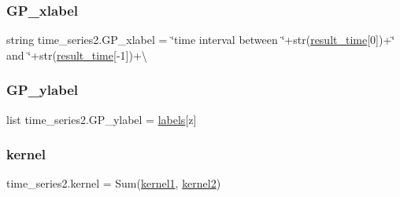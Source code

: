 \mbox{\label{namespacetime__series2_ab96e591ad1ad71d491e9c0911dbcfb3f}} 
\subsubsection{\texorpdfstring{G\+P\+\_\+xlabel}{GP\_xlabel}}
{\footnotesize\ttfamily string time\+\_\+series2.\+G\+P\+\_\+xlabel = \char`\"{}time interval between \char`\"{}+str(\mbox{\hyperlink{namespacetime__series2_a8bc1ba75be8714303adfe853be1fdfa7}{result\+\_\+time}}\mbox{[}0\mbox{]})+\char`\"{} and \char`\"{}+str(\mbox{\hyperlink{namespacetime__series2_a8bc1ba75be8714303adfe853be1fdfa7}{result\+\_\+time}}\mbox{[}-\/1\mbox{]})+\textbackslash{}}

\mbox{\label{namespacetime__series2_a21760fd1a155e704a4ebc53bcdd542dd}} 
\subsubsection{\texorpdfstring{G\+P\+\_\+ylabel}{GP\_ylabel}}
{\footnotesize\ttfamily list time\+\_\+series2.\+G\+P\+\_\+ylabel = \mbox{\hyperlink{namespacetime__series2_aca78083d23e0850ea4120fa6817af6fb}{labels}}\mbox{[}z\mbox{]}}

\mbox{\label{namespacetime__series2_a79d2d803d9f27eb4ed08932199d79a23}} 
\subsubsection{\texorpdfstring{kernel}{kernel}}
{\footnotesize\ttfamily time\+\_\+series2.\+kernel = Sum(\mbox{\hyperlink{namespacetime__series2_aa8462353b2fa60dd1b67e2d81b1f53a5}{kernel1}}, \mbox{\hyperlink{namespacetime__series2_acf4bc51affffd98b22fcd3442438fff0}{kernel2}})}

\mbox{\label{namespacetime__series2_aa8462353b2fa60dd1b67e2d81b1f53a5}} 
